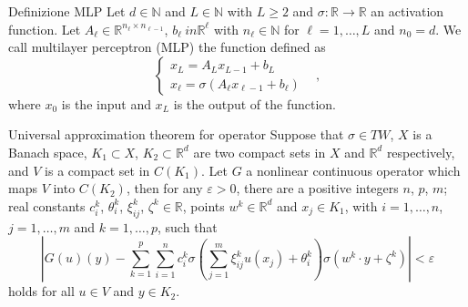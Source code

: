 \documentclass{beamer}
\newcommand{\numberset}{\mathbb}
\newcommand{\N}{\numberset{N}}
\newcommand{\R}{\numberset{R}}
\begin{document}

\begin{frame}[noframenumbering]{Definizione MLP}
	Let $ d \in \N $ and $ L\in \N $ with $ L \ge 2 $ and $ \sigma : \R \to \R  $ an activation function. Let $ A_{\ell} \in \R^{n_{\ell}\times n_{\ell-1}} $, $ b_{\ell} \ in \R^{\ell} $ with $ n_{\ell}\in \N $ for $ \ell = 1, \dots, L $	and $ n_{0} = d $. We call multilayer perceptron (MLP) the function defined as
	\[ \begin{cases}
		x_{L} = A_{L}x_{L-1} + b_{L} \qquad & \\
		x_{\ell} = \sigma\left( A_{\ell}x_{\ell-1} + b_{\ell} \right) 
	\end{cases}, \]
	where $ x_0 $ is the input and $ x_{L} $ is the output of the function.
\end{frame}


\begin{frame}[noframenumbering]{Universal approximation theorem for operator}
	Suppose that $ \sigma \in TW $, $ X $ is a Banach space, $ K_1 \subset X $, $ K_2 \subset \R^d $ are two compact sets in $ X $ and $ \R^{d} $ respectively, and $ V $ is a compact set in $ C(K_1) $. Let $ G $ a nonlinear continuous operator which maps $ V $ into $ C(K_2) $, then for any $ \varepsilon > 0 $, there are a positive integers $ n $, $ p $, $ m $; real constants $ c_i^{k}$, $ \theta_i^{k}$, $ \xi_{ij}^{k} $, $ \zeta^k \in \R $, points $ w^{k} \in \R^d $ and $ x_j \in K_1 $, with $ i = 1, \dots, n$, $ j = 1, \dots, m $ and $ k = 1, \dots, p $, such that
	\[ \left| G(u)(y) - \sum_{k=1}^{p}\sum_{i=1}^{n}c_i^k \sigma \left( \sum_{j=1}^{m} \xi_{ij}^k u(x_j) + \theta_i^k \right) \sigma(w^k \cdot y + \zeta^k) \right| < \varepsilon  \]
	holds for all $ u \in V $ and $ y \in K_2 $.
\end{frame}
\end{document}
